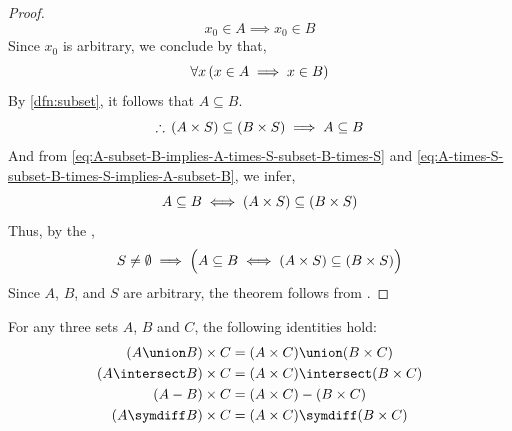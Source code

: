 \begin{proof}
\begin{equation*}
        x_{0} \in A \implies x_{0} \in B
    \end{equation*}
    Since \( x_{0} \) is arbitrary, we conclude by  that,
    \begin{equation*}
        \forall x \, \mleft( x \in A \implies x \in B \mright)
    \end{equation*}
    By \cref{dfn:subset}, it follows that \( A \subseteq B\).
    \begin{equation}
        \label{eq:A-times-S-subset-B-times-S-implies-A-subset-B}
        \therefore \, \mleft( A \times S \mright) \subseteq \mleft( B \times S \mright) \implies A \subseteq B
    \end{equation}
    And from \eqref{eq:A-subset-B-implies-A-times-S-subset-B-times-S} and \eqref{eq:A-times-S-subset-B-times-S-implies-A-subset-B},
    we infer,
    \begin{equation*}
        A \subseteq B \iff \mleft( A \times S \mright) \subseteq \mleft( B \times S \mright)
    \end{equation*}
    Thus, by the ,
    \begin{equation*}
        S \neq \emptyset \implies \Big( A \subseteq B \iff \mleft( A \times S \mright) \subseteq \mleft( B \times S \mright) \Big)
    \end{equation*}
    Since \( A \), \( B \), and \( S \) are arbitrary, the theorem follows from .
\end{proof}

\begin{thm}
    \label{set-identities:right-distributivity-of-cartesian-products}
    For any three sets \( A \), \( B \) and \( C \), the following identities hold:
    \begin{gather*}
        \mleft( A \union B \mright) \times C = \mleft( A \times C \mright) \union \mleft( B \times C \mright)\\
        \mleft( A \intersect B \mright) \times C = \mleft( A \times C \mright) \intersect \mleft( B \times C \mright)\\
        \mleft( A - B \mright) \times C = \mleft( A \times C \mright) - \mleft( B \times C \mright)\\
        \mleft( A \symdiff B \mright) \times C = \mleft( A \times C \mright) \symdiff \mleft( B \times C \mright)
    \end{gather*}
\end{thm}

